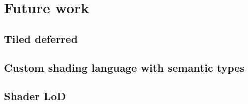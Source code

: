 
\chapter{ Future work }
\label{Chapter8}

\section{Tiled deferred}
\section{Custom shading language with semantic types}
\section{Shader LoD}
